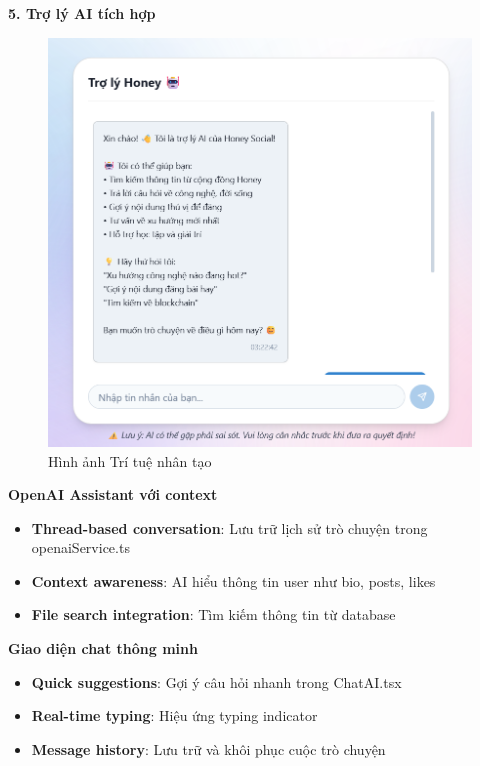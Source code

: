 \textbf{5. Trợ lý AI tích hợp}
\begin{figure}[H]
    \centering
    \includegraphics[width=1\textwidth]{image/thucnghiem/ai.png}
    \caption{Hình ảnh Trí tuệ nhân tạo}
    \label{fig:tri_tue_nhan_tao}
\end{figure}
\textbf{OpenAI Assistant với context}
\begin{itemize}
    \item \textbf{Thread-based conversation}: Lưu trữ lịch sử trò chuyện trong openaiService.ts
    \item \textbf{Context awareness}: AI hiểu thông tin user như bio, posts, likes
    \item \textbf{File search integration}: Tìm kiếm thông tin từ database
\end{itemize}

\textbf{Giao diện chat thông minh}
\begin{itemize}
    \item \textbf{Quick suggestions}: Gợi ý câu hỏi nhanh trong ChatAI.tsx
    \item \textbf{Real-time typing}: Hiệu ứng typing indicator
    \item \textbf{Message history}: Lưu trữ và khôi phục cuộc trò chuyện
\end{itemize}

